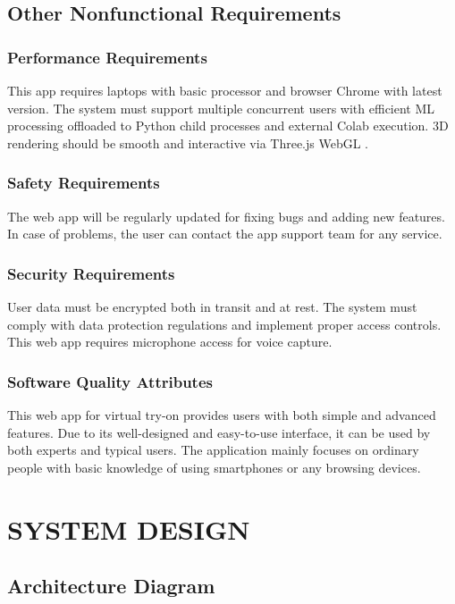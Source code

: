\documentclass[12pt,a4paper,oneside]{report}
\begin{document}
\section{Other Nonfunctional Requirements}

\subsection{Performance Requirements}
This app requires laptops with basic processor and browser Chrome with latest version. The system must support multiple concurrent users with efficient ML processing offloaded to Python child processes and external Colab execution. 3D rendering should be smooth and interactive via Three.js WebGL \cite{6}.

\subsection{Safety Requirements}
The web app will be regularly updated for fixing bugs and adding new features. In case of problems, the user can contact the app support team for any service.

\subsection{Security Requirements}
User data must be encrypted both in transit and at rest. The system must comply with data protection regulations and implement proper access controls. This web app requires microphone access for voice capture.

\subsection{Software Quality Attributes}
This web app for virtual try-on provides users with both simple and advanced features. Due to its well-designed and easy-to-use interface, it can be used by both experts and typical users. The application mainly focuses on ordinary people with basic knowledge of using smartphones or any browsing devices.

\chapter{SYSTEM DESIGN}

\section{Architecture Diagram}
\end{document}
